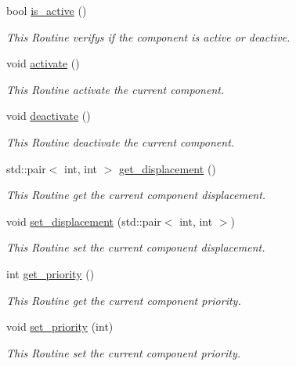 \begin{DoxyCompactItemize}
\item 
bool \hyperlink{classengine_1_1_component_ae1a97027b9862ee3e41e6566501d765e}{is\+\_\+active} ()
\begin{DoxyCompactList}\small\item\em This Routine verifys if the component is active or deactive. \end{DoxyCompactList}\item 
void \hyperlink{classengine_1_1_component_aaab29ea159109b4d0f63e9c519be6139}{activate} ()
\begin{DoxyCompactList}\small\item\em This Routine activate the current component. \end{DoxyCompactList}\item 
void \hyperlink{classengine_1_1_component_aa4d1e5e0656ed03f7ff469db25f65053}{deactivate} ()
\begin{DoxyCompactList}\small\item\em This Routine deactivate the current component. \end{DoxyCompactList}\item 
std\+::pair$<$ int, int $>$ \hyperlink{classengine_1_1_component_a3a79b22c29f442c6f4b6fb648e97dc47}{get\+\_\+displacement} ()
\begin{DoxyCompactList}\small\item\em This Routine get the current component displacement. \end{DoxyCompactList}\item 
void \hyperlink{classengine_1_1_component_a9b8b506c27cd4fe0080deaf9ffe2b9be}{set\+\_\+displacement} (std\+::pair$<$ int, int $>$)
\begin{DoxyCompactList}\small\item\em This Routine set the current component displacement. \end{DoxyCompactList}\item 
int \hyperlink{classengine_1_1_component_a9b786021a986a812d841983e36bea127}{get\+\_\+priority} ()
\begin{DoxyCompactList}\small\item\em This Routine get the current component priority. \end{DoxyCompactList}\item 
void \hyperlink{classengine_1_1_component_aa746b97a8ad828e50a957d89afcb68b6}{set\+\_\+priority} (int)
\begin{DoxyCompactList}\small\item\em This Routine set the current component priority. \end{DoxyCompactList}\item 

\end{DoxyCompactItemize}
